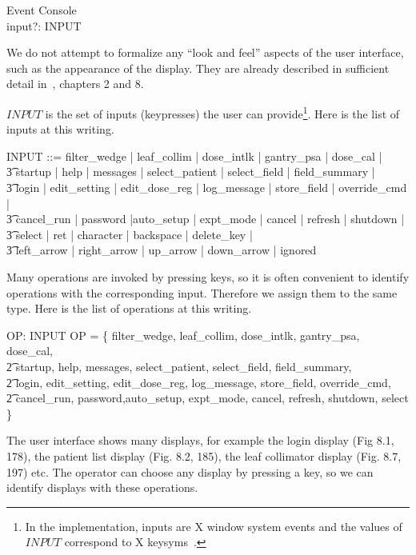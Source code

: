 \documentclass{article}
\begin{document}
\begin{schema}{Event}
	\Delta Console \\
	input?: INPUT
\end{schema}
We do not attempt to formalize any ``look and feel'' aspects of the
user interface, such as the appearance of the display.  They are
already described in sufficient detail in~\cite{jacky92}, chapters 2
and 8.

$INPUT$ is the set of inputs (keypresses) the user can
provide\footnote{In the implementation, inputs are X window system
events and the values of $INPUT$ correspond to X
keysyms~\cite{nye88}.}.  Here is the list of inputs at this writing.

\begin{zed} 
INPUT ::= filter\_wedge | leaf\_collim | dose\_intlk | gantry\_psa | dose\_cal | \\
\t3	startup | help | messages | select\_patient | select\_field | field\_summary | \\
\t3	login | edit\_setting | edit\_dose\_reg | log\_message | store\_field | override\_cmd | \\
\t3	cancel\_run | password |auto\_setup | expt\_mode | cancel | refresh | shutdown | \\
\t3	 select | ret | character | backspace | delete\_key | \\ 
\t3	left\_arrow | right\_arrow | up\_arrow | down\_arrow | ignored
\end{zed}
Many operations are invoked by pressing keys, so it is often
convenient to identify operations with the corresponding input.
Therefore we assign them to the same type.   Here is the list of 
operations at this writing.

\begin{axdef}
	OP: \power INPUT
\where
OP = \{ filter\_wedge, leaf\_collim, dose\_intlk, gantry\_psa, dose\_cal, \\
\t2 startup, help, messages, select\_patient, select\_field, field\_summary, \\
\t2 login, edit\_setting, edit\_dose\_reg, log\_message, store\_field, override\_cmd, \\
\t2 cancel\_run, password,auto\_setup, expt\_mode, cancel, refresh, shutdown, select \}
\end{axdef}
The user interface shows many displays, for example the login display
(Fig 8.1, 178), the patient list display (Fig. 8.2, 185), the leaf
collimator display (Fig. 8.7, 197) etc.  The operator can choose any
display by pressing a key, so we can identify displays with these
operations.
\end{document}
